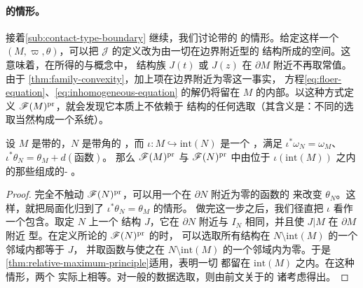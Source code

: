 \paragraph{\trContactTypeBoundary{}的情形。}\label{sub:contact-type-boundary-case}
接着\cref{sub:contact-type-boundary} 继续，我们讨论带\trContactTypeBoundary{}的%
\trExactSymplectic\trManifold{}的情形。给定这样一个\trManifold{} $(M,\varpi,\theta)$，可以把
$\mathscr{J}$ 的定义改为由一切在边界附近\trContact{}型的\trCompatible\trAlmostComplex{}%
结构所成的空间。这意味着，在所得的\trFloerDatum{}与\trPerturbationDatum{}概念中，
\trAlmostComplex{}结构族 $J(t)$ 或 $J(z)$ 在 $\partial M$ 附近不再取常值。由于
\cref{thm:family-convexity}，加上\trInhomogeneous{}项在边界附近为零这一事实，
方程\eqref{eq:floer-equation}、\eqref{eq:inhomogeneous-equation} 的解仍将留在
$M$ 的内部。以这种方式定义 $\mathscr{F}(M)^{\mathrm{pr}}$，就会发现它本质上不依赖于%
\trAlmostComplex{}结构的任何选取（其含义是：不同的选取当然构成一个\trCoherent{}系统）。
\begin{proposition}\label{thm:contact-type-embedding-quasi-iso}
设 $M$ 是带\trContactTypeBoundary{}的\trExactSymplectic\trManifold，$N$ 是带角的%
\trExactSymplectic\trManifold，而 $\iota\colon M\hookrightarrow\mathrm{int}(N)$ 是一个%
\trEmbedding，满足 $\iota^*\omega_N=\omega_M$、$\iota^*\theta_N=\theta_M+d(\text{函数})$。%
那么 $\mathscr{F}(M)^{\mathrm{pr}}$ 与 $\mathscr{F}(N)^{\mathrm{pr}}$ 中由位于 $\iota(\mathrm{int}(M))$
之内的那些\trExact\trLagrange\trSubmanifold{}组成的\trAinfty-\trFullSubcategory{}
\trQuasiisomorphic。
\end{proposition}
\begin{proof}
完全不触动 $\mathscr{F}(N)^{\mathrm{pr}}$，可以用一个在 $\partial N$ 附近为零的函数的%
\trDifferential{}来改变 $\theta_N$。这样，就把局面化归到了 $\iota^*\theta_N=\theta_M$ 的情形。
做完这一步之后，我们径直把 $\iota$ 看作一个包含。取定 $N$ 上一个\trAlmostComplex{}%
结构 $J$，它在 $\partial N$ 附近与 $I_N$ 相同，并且使 $J|M$ 在 $\partial M$ 附近%
\trContact{}型。在定义所论的 $\mathscr{F}(N)^{\mathrm{pr}}$ 的\trFullSubcategory{}时，
可以选取所有\trAlmostComplex{}结构在 $N\setminus\mathrm{int}(M)$ 的一个邻域内都等于 $J$，%
并取\trHamiltonian{}函数与\trPerturbationDatum{}使之在 $N\setminus\mathrm{int}(M)$
的一个邻域内为零。于是\cref{thm:relative-maximum-principle}适用，表明一切%
\trInhomogeneous\trPseudoholomorphic\trPolygon{}都留在 $\mathrm{int}(M)$ 之内。在这种情形，两个%
\trCategory{}实际上相等。对一般的数据选取，\trQuasiisomorphism{}则由前文关于\trWellDefinedness{}的%
诸考虑得出。
\end{proof}
